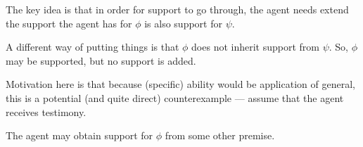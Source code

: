 \begin{note}
  The key idea is that in order for support to go through, the agent needs extend the support the agent has for \(\phi\) is also support for \(\psi\).

  {
    \color{red}
    A different way of putting things is that \(\phi\) does not inherit support from \(\psi\).
    So, \(\phi\) may be supported, but no support is added.
  }


  {
    \color{green}
    Motivation here is that because (specific) ability would be application of general, this is a potential (and quite direct) counterexample --- assume that the agent receives testimony.
  }


  {
    \color{red}
    The agent may obtain support for \(\phi\) from some other premise.
  }
\end{note}

